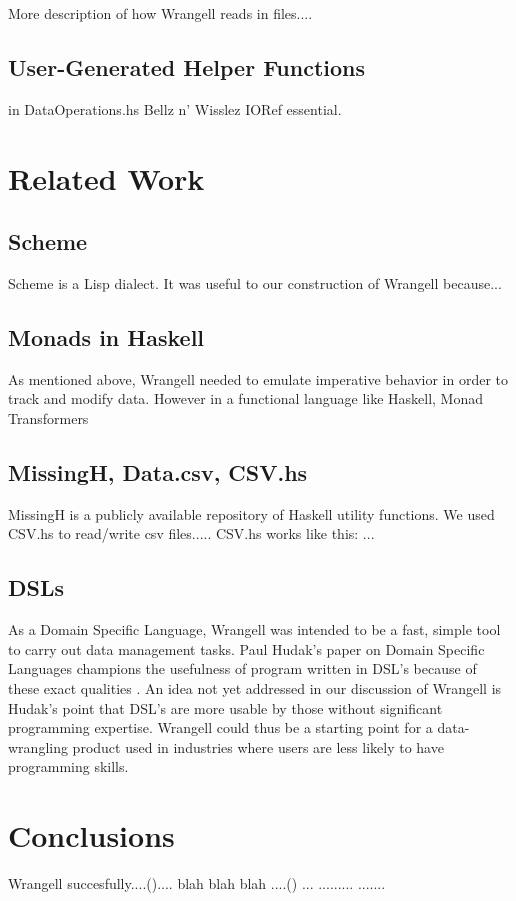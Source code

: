 \documentclass[preprint,nocopyrightspace]{sig-alternate}
\begin{document}
More description of how Wrangell reads in files....  

\subsection{User-Generated Helper Functions}
in DataOperations.hs
Bellz n' Wisslez
IORef essential. 

\section{Related Work}

\subsection{Scheme}
Scheme is a Lisp dialect. It was useful to our construction of Wrangell because...
\cite{scheme}

\subsection{Monads in Haskell}
As mentioned above, Wrangell needed to emulate imperative behavior in order to track and modify data. However in a functional language like Haskell, 
Monad Transformers \citep{monadTransform}

\subsection{MissingH, Data.csv, CSV.hs}
MissingH is a publicly available repository of Haskell utility functions. We used CSV.hs to read/write csv files..... CSV.hs works like this: ... 

\subsection{DSLs}
As a Domain Specific Language, Wrangell was intended to be a fast, simple tool to carry out data management tasks. Paul Hudak's paper on Domain Specific Languages champions the usefulness of program written in DSL's because of these exact qualities \cite{DSLs}. An idea not yet addressed in our discussion of Wrangell is Hudak's point that DSL's are more usable by those without significant programming expertise. Wrangell could thus be a starting point for a data-wrangling product used in industries where users are less likely to have programming skills. 




\section{Conclusions}
Wrangell succesfully....().... blah blah blah ....() ...
.........
.......
\end{document}
